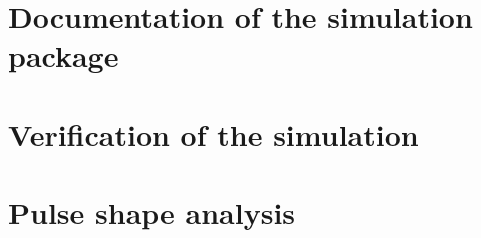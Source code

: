 \documentclass[11pt, a4paper]{article}
\begin{document}
\section{Documentation of the simulation package}
\label{sec:manual}







\section{Verification of the simulation}
\label{sec:verify}




\section{Pulse shape analysis}
\label{sec:physics}


\clearpage
 

\end{document}
